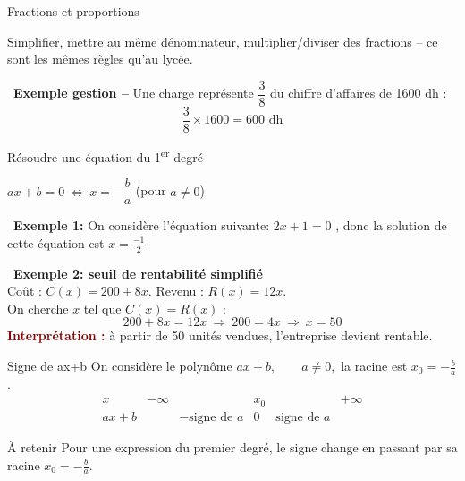 \documentclass[aspectratio=169,11pt]{beamer}
\newcommand{\important}[1]{\textcolor{DarkRed}{\textbf{#1}}}
\begin{document}
	\begin{frame}{Fractions et proportions}
		\begin{definitionbox}
			Simplifier, mettre au même dénominateur, multiplier/diviser des fractions -- ce sont les
			mêmes règles qu'au lycée.
		\end{definitionbox}
		
		\vspace{0.3cm}
		\begin{applicationbox}
			\faBriefcase\ \textbf{Exemple gestion --} Une charge représente $\dfrac{3}{8}$ du chiffre
			d'affaires de 1600 dh :
			\[
			\frac{3}{8}\times 1600 = 600 \text{ dh}
			\]
		\end{applicationbox}
	\end{frame}
	
	\begin{frame}{Résoudre une équation du 1\textsuperscript{er} degré}
		\begin{definitionbox}
			$ax+b=0 \ \Longleftrightarrow\ x=-\dfrac{b}{a}$ \quad (pour $a\neq 0$)
		\end{definitionbox}
		
		\pause
		\begin{applicationbox}
			\faBriefcase\ 	\textbf{Exemple 1: } On considère l'équation suivante:  $2x+1=0$ , donc la solution de cette équation  est $x=\frac{-1}{2}$
		\end{applicationbox}
		
		\begin{applicationbox}
			\faBriefcase\ \textbf{Exemple 2: seuil de rentabilité simplifié} \\
			Coût : $C(x)=200+8x$. \quad Revenu : $R(x)=12x$. \\
			On cherche $x$ tel que $C(x)=R(x)$ :
			\[
			200+8x = 12x \ \Longrightarrow\ 200 = 4x \ \Longrightarrow\ x = 50
			\]
			\pause
			\important{Interprétation :} à partir de 50 unités vendues, l'entreprise devient rentable.
		\end{applicationbox}
	\end{frame}
	\begin{frame}{Signe de ax+b}
		On considère le polynôme $	ax+b,\qquad a\neq0,$ la racine est $x_0=-\frac{b}{a}$.
		\[
		\begin{array}{c|ccccc}
			x      & -\infty &                                  & x_0&               &+\infty \\ \hline
			ax+b &            & -\mbox{signe de }a & 0   & \mbox{signe de }a& 
		\end{array}
		\]
		\begin{alertblock}{À retenir}
			Pour une expression du premier degré, le signe change en passant par
			sa racine $x_0=-\frac{b}{a}$.
		\end{alertblock}
	\end{frame}
	
\end{document}
